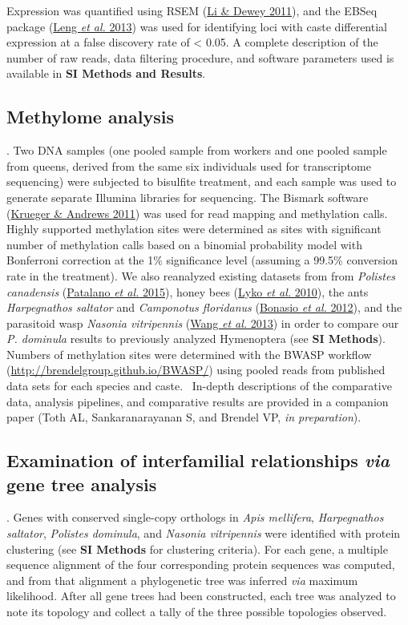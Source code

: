 Expression was quantified using RSEM
(\protect\hyperlink{ux5fENREFux5f31}{Li \& Dewey 2011}), and the EBSeq
package (\protect\hyperlink{ux5fENREFux5f30}{Leng \textit{et al.} 2013})
was used for identifying loci with caste differential expression at a
false discovery rate of \textless{} 0.05. A complete description of the
number of raw reads, data filtering procedure, and software parameters
used is available in \textbf{SI Methods and Results}.

\subsection{Methylome analysis}. Two DNA samples (one pooled sample from
workers and one pooled sample from queens, derived from the same six
individuals used for transcriptome sequencing) were subjected to
bisulfite treatment, and each sample was used to generate separate
Illumina libraries for sequencing. The Bismark software
(\protect\hyperlink{ux5fENREFux5f27}{Krueger \& Andrews 2011}) was used
for read mapping and methylation calls. Highly supported methylation
sites were determined as sites with significant number of methylation
calls based on a binomial probability model with Bonferroni correction
at the 1\% significance level (assuming a 99.5\% conversion rate in the
treatment). We also reanalyzed existing datasets from from
\textit{Polistes canadensis} (\protect\hyperlink{ux5fENREFux5f43}{Patalano
\textit{et al.} 2015}), honey bees
(\protect\hyperlink{ux5fENREFux5f33}{Lyko \textit{et al.} 2010}), the ants
\textit{Harpegnathos saltator} and \textit{Camponotus floridanus}
(\protect\hyperlink{ux5fENREFux5f4}{Bonasio \textit{et al.} 2012}), and
the parasitoid wasp \textit{Nasonia vitripennis}
(\protect\hyperlink{ux5fENREFux5f65}{Wang \textit{et al.} 2013}) in order
to compare our \textit{P. dominula} results to previously analyzed
Hymenoptera (see \textbf{SI Methods}). Numbers of methylation sites were
determined with the BWASP workflow
(\url{http://brendelgroup.github.io/BWASP/}) using pooled reads from
published data sets for each species and caste.~ In-depth descriptions
of the comparative data, analysis pipelines, and comparative results are
provided in a companion paper (Toth AL, Sankaranarayanan S, and Brendel
VP, \textit{in preparation}).

\subsection{Examination of interfamilial relationships \textit{via} gene tree
analysis}. Genes with conserved single-copy orthologs in \textit{Apis
mellifera}, \textit{Harpegnathos saltator}, \textit{Polistes dominula}, and
\textit{Nasonia vitripennis} were identified with protein clustering (see
\textbf{SI Methods} for clustering criteria). For each gene, a multiple
sequence alignment of the four corresponding protein sequences was
computed, and from that alignment a phylogenetic tree was inferred
\textit{via} maximum likelihood. After all gene trees had been
constructed, each tree was analyzed to note its topology and collect a
tally of the three possible topologies observed.

